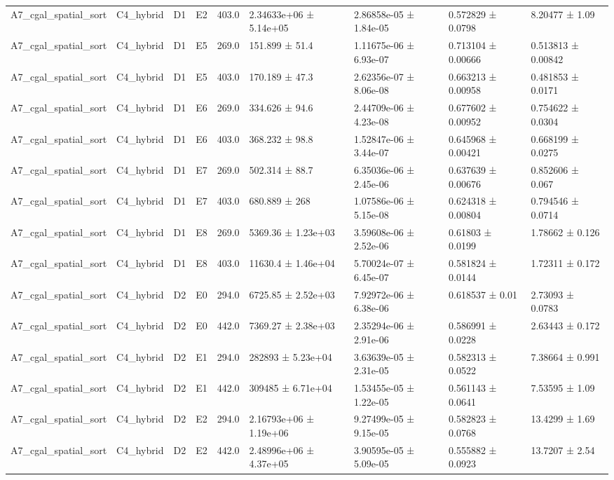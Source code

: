 \begin{table}
\begin{tabular}{lllllllll}
A7\_cgal\_spatial\_sort & C4\_hybrid & D1 & E2 & 403.0 & 2.34633e+06 ± 5.14e+05 & 2.86858e-05 ± 1.84e-05 & 0.572829 ± 0.0798 & 8.20477 ± 1.09 \\
A7\_cgal\_spatial\_sort & C4\_hybrid & D1 & E5 & 269.0 & 151.899 ± 51.4 & 1.11675e-06 ± 6.93e-07 & 0.713104 ± 0.00666 & 0.513813 ± 0.00842 \\
A7\_cgal\_spatial\_sort & C4\_hybrid & D1 & E5 & 403.0 & 170.189 ± 47.3 & 2.62356e-07 ± 8.06e-08 & 0.663213 ± 0.00958 & 0.481853 ± 0.0171 \\
A7\_cgal\_spatial\_sort & C4\_hybrid & D1 & E6 & 269.0 & 334.626 ± 94.6 & 2.44709e-06 ± 4.23e-08 & 0.677602 ± 0.00952 & 0.754622 ± 0.0304 \\
A7\_cgal\_spatial\_sort & C4\_hybrid & D1 & E6 & 403.0 & 368.232 ± 98.8 & 1.52847e-06 ± 3.44e-07 & 0.645968 ± 0.00421 & 0.668199 ± 0.0275 \\
A7\_cgal\_spatial\_sort & C4\_hybrid & D1 & E7 & 269.0 & 502.314 ± 88.7 & 6.35036e-06 ± 2.45e-06 & 0.637639 ± 0.00676 & 0.852606 ± 0.067 \\
A7\_cgal\_spatial\_sort & C4\_hybrid & D1 & E7 & 403.0 & 680.889 ± 268 & 1.07586e-06 ± 5.15e-08 & 0.624318 ± 0.00804 & 0.794546 ± 0.0714 \\
A7\_cgal\_spatial\_sort & C4\_hybrid & D1 & E8 & 269.0 & 5369.36 ± 1.23e+03 & 3.59608e-06 ± 2.52e-06 & 0.61803 ± 0.0199 & 1.78662 ± 0.126 \\
A7\_cgal\_spatial\_sort & C4\_hybrid & D1 & E8 & 403.0 & 11630.4 ± 1.46e+04 & 5.70024e-07 ± 6.45e-07 & 0.581824 ± 0.0144 & 1.72311 ± 0.172 \\
A7\_cgal\_spatial\_sort & C4\_hybrid & D2 & E0 & 294.0 & 6725.85 ± 2.52e+03 & 7.92972e-06 ± 6.38e-06 & 0.618537 ± 0.01 & 2.73093 ± 0.0783 \\
A7\_cgal\_spatial\_sort & C4\_hybrid & D2 & E0 & 442.0 & 7369.27 ± 2.38e+03 & 2.35294e-06 ± 2.91e-06 & 0.586991 ± 0.0228 & 2.63443 ± 0.172 \\
A7\_cgal\_spatial\_sort & C4\_hybrid & D2 & E1 & 294.0 & 282893 ± 5.23e+04 & 3.63639e-05 ± 2.31e-05 & 0.582313 ± 0.0522 & 7.38664 ± 0.991 \\
A7\_cgal\_spatial\_sort & C4\_hybrid & D2 & E1 & 442.0 & 309485 ± 6.71e+04 & 1.53455e-05 ± 1.22e-05 & 0.561143 ± 0.0641 & 7.53595 ± 1.09 \\
A7\_cgal\_spatial\_sort & C4\_hybrid & D2 & E2 & 294.0 & 2.16793e+06 ± 1.19e+06 & 9.27499e-05 ± 9.15e-05 & 0.582823 ± 0.0768 & 13.4299 ± 1.69 \\
A7\_cgal\_spatial\_sort & C4\_hybrid & D2 & E2 & 442.0 & 2.48996e+06 ± 4.37e+05 & 3.90595e-05 ± 5.09e-05 & 0.555882 ± 0.0923 & 13.7207 ± 2.54 \\

\end{tabular}
\end{table}
